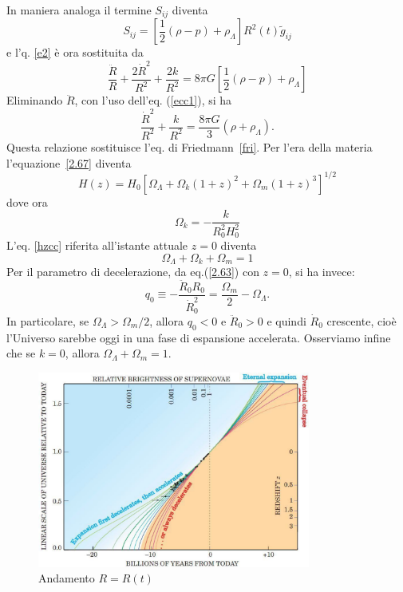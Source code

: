 In maniera analoga il termine $S_{ij}$ diventa
\begin{equation}
  S_{ij}= \left[ \frac {1}{2}(\rho-p)  + \rho_{\Lambda} \right] R^2(t)
  \tilde{g}_{ij}
  \label{sijcc}
\end{equation}
e l'q. \eqref{e2}  è ora sostituita da
\begin{equation}
  \frac {\ddot{R}}{R}+\frac{2\dot{R}^2}{R^2}+\frac{2k}{R^2}=
  8 \pi G \left[ \frac{1}{2}(\rho-p) +\rho_{\Lambda} \right]
\end{equation}
Eliminando $\ddot R$, con l'uso dell'eq. (\ref{ecc1}), si ha
\begin{equation}
  \frac{\dot{R}^2}{R^2} +\frac{k}{R^2} = \frac{8 \pi G}{3} (\rho+\rho_{\Lambda}).
\label{2.67}
\end{equation}
Questa relazione sostituisce l'eq. di Friedmann~\eqref{fri}.  Per l'era della
materia l'equazione~\eqref{2.67} diventa
\begin{equation}
  H(z)=H_0\left[\Omega_{\Lambda}+\Omega_{k}(1+z)^2+\Omega_m (1+z)^3\right]^{1/2}
  \label{hzcc}
\end{equation}
dove ora
\begin{equation}
  \Omega_k = - \frac {k}{R_0^2 H_0^2}
\end{equation}
L'eq. \ref{hzcc} riferita all'istante attuale $z=0$ diventa
\begin{equation}
  \Omega_{\Lambda}+\Omega_{k}+\Omega_m = 1
\end{equation}
Per il parametro di decelerazione, da eq.(\ref{2.63}) con $z=0$, si ha invece:
\begin{equation}
  q_0 \equiv  -\frac {\ddot R_0 R_0}{\dot R^2_0} = \frac{\Omega_m}{2}
  -\Omega_{\Lambda}.
  \label{q0cc}
\end{equation}
In particolare, se $\Omega_{\Lambda} > \Omega_m/2$, allora $q_0<0$ e
$\ddot{R}_0>0$ e quindi $\dot{R}_0$ crescente, cioè l'Universo sarebbe oggi in
una fase di espansione accelerata.  Osserviamo infine che se $k=0$, allora
$\Omega_{\Lambda} + \Omega_m = 1$.
\begin{figure}
  \centering{}
  \includegraphics[width=0.8\textwidth]{figure/Scale_Factor_vs-Time.pdf}
  \caption{Andamento $R=R(t)$}
  \label{fig:Rvst}
\end{figure}

